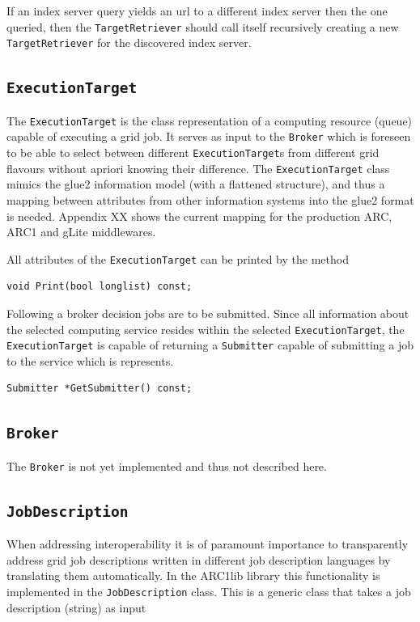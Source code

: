 \documentclass{book}
\newcommand{\TargetRetriever}{\texttt{TargetRetriever}}
\newcommand{\ExecutionTarget}{\texttt{ExecutionTarget}}
\newcommand{\Broker}{\texttt{Broker}}
\newcommand{\Submitter}{\texttt{Submitter}}
\newcommand{\JobDescription}{\texttt{JobDescription}}
\begin{document}
If an index server query yields an url to a different index server then the one queried, then the {\TargetRetriever} should 
call itself recursively creating a new {\TargetRetriever} for the discovered index server. 

\subsection{{\ExecutionTarget}} The {\ExecutionTarget} is the class representation of a computing resource (queue) capable of 
executing a grid job. It serves as input to the {\Broker} which is foreseen to be able to select between different 
{\ExecutionTarget}s from different grid flavours without apriori knowing their difference. The {\ExecutionTarget} class 
mimics the glue2 information model (with a flattened structure), and thus a mapping between attributes from other information 
systems into the glue2 format is needed.  Appendix XX shows the current mapping for the production ARC, ARC1 and gLite middlewares. 

All attributes of the {\ExecutionTarget} can be printed by the method

\begin{shaded}
\begin{verbatim}                                                                                                                            
void Print(bool longlist) const;
\end{verbatim}
\end{shaded}

Following a broker decision jobs are to be submitted. Since all information about the selected computing service resides within the 
selected {\ExecutionTarget}, the {\ExecutionTarget} is capable of returning a {\Submitter} capable of submitting a 
job to the service which is represents.

\begin{shaded}
\begin{verbatim}
Submitter *GetSubmitter() const;
\end{verbatim}
\end{shaded}

\subsection{{\Broker}} The {\Broker} is not yet implemented and thus not described here.

\subsection{{\JobDescription}} When addressing interoperability it is of paramount importance to transparently address grid job 
descriptions written in different job description languages by translating them automatically. In the ARC1lib library this functionality 
is implemented in the {\JobDescription} class. This is a generic class that takes a job description (string) as input 
\end{document}
